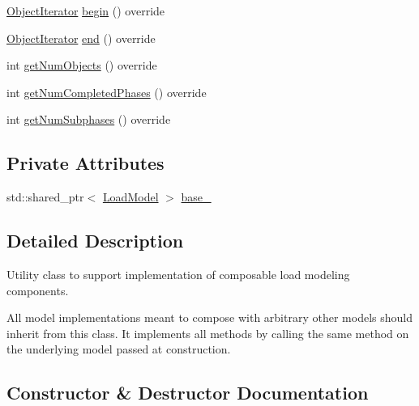 \begin{DoxyCompactItemize}
\hyperlink{classvt_1_1vrt_1_1collection_1_1balance_1_1_object_iterator}{Object\+Iterator} \hyperlink{classvt_1_1vrt_1_1collection_1_1balance_1_1_composed_model_a8f34205887c08a22a1e5bef6ee358f2b}{begin} () override
\item 
\hyperlink{classvt_1_1vrt_1_1collection_1_1balance_1_1_object_iterator}{Object\+Iterator} \hyperlink{classvt_1_1vrt_1_1collection_1_1balance_1_1_composed_model_a23ca95221c6bffb7417aafa2c939b40a}{end} () override
\item 
int \hyperlink{classvt_1_1vrt_1_1collection_1_1balance_1_1_composed_model_a7b383954706cb8069e841a87c3ff3f8f}{get\+Num\+Objects} () override
\item 
int \hyperlink{classvt_1_1vrt_1_1collection_1_1balance_1_1_composed_model_a20736b80cf2b19d1a9352363b48039e0}{get\+Num\+Completed\+Phases} () override
\item 
int \hyperlink{classvt_1_1vrt_1_1collection_1_1balance_1_1_composed_model_af3ea09828c281d9c278198a19fe4e533}{get\+Num\+Subphases} () override
\end{DoxyCompactItemize}
\subsection*{Private Attributes}
\begin{DoxyCompactItemize}
\item 
std\+::shared\+\_\+ptr$<$ \hyperlink{classvt_1_1vrt_1_1collection_1_1balance_1_1_load_model}{Load\+Model} $>$ \hyperlink{classvt_1_1vrt_1_1collection_1_1balance_1_1_composed_model_a8a2a6b2d5e79a7c02002132913c9ae55}{base\+\_\+}
\end{DoxyCompactItemize}


\subsection{Detailed Description}
Utility class to support implementation of composable load modeling components. 

All model implementations meant to compose with arbitrary other models should inherit from this class. It implements all methods by calling the same method on the underlying model passed at construction. 

\subsection{Constructor \& Destructor Documentation}
\mbox{\label{classvt_1_1vrt_1_1collection_1_1balance_1_1_composed_model_a84b77c1fceb9e07a0706b896a4d9e9c9}} 
